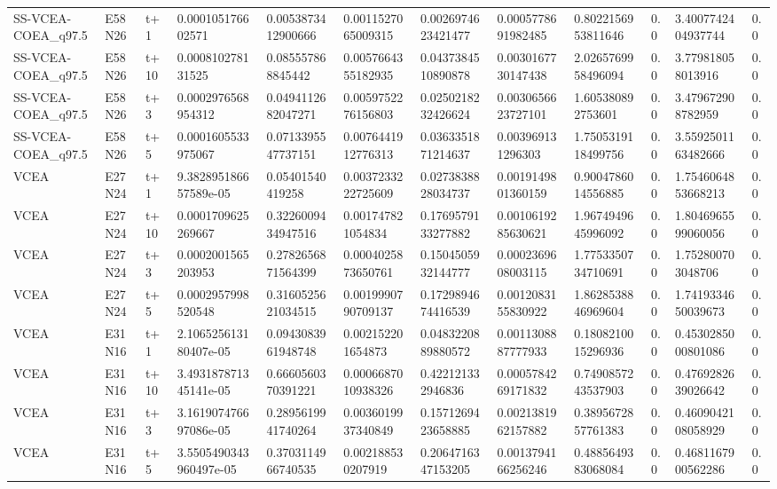 \begin{landscape}
\begin{longtable}{llllllllllll}
SS-VCEA-COEA\_q97.5 & E58N26 & t+1 & 0.000105176602571 & 0.0053873412900666 & 0.0011527065009315 & 0.0026974623421477 & 0.0005778691982485 & 0.8022156953811646 & 0.0 & 3.4007742404937744 & 0.0 \\
SS-VCEA-COEA\_q97.5 & E58N26 & t+10 & 0.000810278131525 & 0.085557868845442 & 0.0057664355182935 & 0.0437384510890878 & 0.0030167730147438 & 2.0265769958496094 & 0.0 & 3.779818058013916 & 0.0 \\
SS-VCEA-COEA\_q97.5 & E58N26 & t+3 & 0.0002976568954312 & 0.0494112682047271 & 0.0059752276156803 & 0.0250218232426624 & 0.0030656623727101 & 1.605380892753601 & 0.0 & 3.479672908782959 & 0.0 \\
SS-VCEA-COEA\_q97.5 & E58N26 & t+5 & 0.0001605533975067 & 0.0713395547737151 & 0.0076441912776313 & 0.0363351871214637 & 0.003969131296303 & 1.7505319118499756 & 0.0 & 3.5592501163482666 & 0.0 \\
VCEA & E27N24 & t+1 & 9.382895186657589e-05 & 0.05401540419258 & 0.0037233222725609 & 0.0273838828034737 & 0.0019149801360159 & 0.9004786014556885 & 0.0 & 1.7546064853668213 & 0.0 \\
VCEA & E27N24 & t+10 & 0.0001709625269667 & 0.3226009434947516 & 0.001747821054834 & 0.1769579133277882 & 0.0010619285630621 & 1.9674949645996092 & 0.0 & 1.8046965599060056 & 0.0 \\
VCEA & E27N24 & t+3 & 0.0002001565203953 & 0.2782656871564399 & 0.0004025873650761 & 0.1504505932144777 & 0.0002369608003115 & 1.7753350734710691 & 0.0 & 1.752800703048706 & 0.0 \\
VCEA & E27N24 & t+5 & 0.0002957998520548 & 0.3160525621034515 & 0.0019990790709137 & 0.1729894674416539 & 0.0012083155830922 & 1.8628538846969604 & 0.0 & 1.7419334650039673 & 0.0 \\
VCEA & E31N16 & t+1 & 2.106525613180407e-05 & 0.0943083961948748 & 0.002152201654873 & 0.0483220889880572 & 0.0011308887777933 & 0.1808210015296936 & 0.0 & 0.4530285000801086 & 0.0 \\
VCEA & E31N16 & t+10 & 3.493187871345141e-05 & 0.6660560370391221 & 0.0006687010938326 & 0.422121332946836 & 0.0005784269171832 & 0.7490857243537903 & 0.0 & 0.4769282639026642 & 0.0 \\
VCEA & E31N16 & t+3 & 3.161907476697086e-05 & 0.2895619941740264 & 0.0036019937340849 & 0.1571269423658885 & 0.0021381962157882 & 0.3895672857761383 & 0.0 & 0.4609042108058929 & 0.0 \\
VCEA & E31N16 & t+5 & 3.5505490343960497e-05 & 0.3703114966740535 & 0.002188530207919 & 0.2064716347153205 & 0.0013794166256246 & 0.4885649383068084 & 0.0 & 0.4681167900562286 & 0.0 \\

\end{longtable}
\end{landscape}
